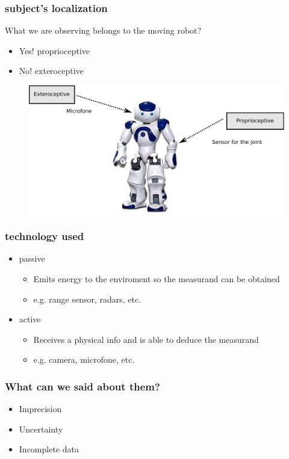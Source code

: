 \documentclass{beamer}
\begin{document}
	\begin{frame}
		\frametitle{subject's localization}
		What we are observing belongs to the moving robot?
		\begin{itemize}
		\item Yes! proprioceptive
		\item No! exteroceptive
		\end{itemize}
		\begin{figure}[h]
			\center
			\includegraphics[scale=0.4]{img/fig:nao:config}
		 \end{figure}		
	\end{frame}

	\begin{frame}
		\frametitle{technology used}
		\begin{itemize}
		\item passive
			\begin{itemize}
				\item Emits energy to the enviroment so the measurand can be obtained
				\item e.g. range sensor, radars, etc.
			\end{itemize}		
		\item active
			\begin{itemize}
				\item Receives a physical info and is able to deduce the measurand
				\item e.g. camera, microfone, etc. 
			\end{itemize}		
		\end{itemize}		
		
	\end{frame}
	
	\begin{frame}
		\frametitle{What can we said about them?}

		\begin{itemize}
			\item Imprecision
			\item Uncertainty
			\item Incomplete data
		\end{itemize}		
		
	\end{frame}
\end{document}
